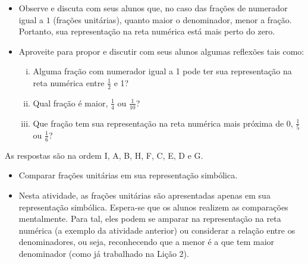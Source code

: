 \begin{orientacoes}{}{}
   \begin{itemize}
   \item  Observe e discuta com seus alunos que, no caso das frações de numerador igual a $1$ (frações unitárias), quanto maior o denominador, menor a fração. Portanto, sua representação na reta numérica está mais perto do zero.
   \item  Aproveite para propor e discutir com seus alunos algumas reflexões tais como:
   \begin{enumerate}[(i)]
    \item Alguma fração com numerador igual a 1 pode ter sua representação na reta numérica entre $\frac{1}{2}$ e 1?
    \item Qual fração é maior, $\frac{1}{4}$ ou $\frac{1}{10}$?
    \item Que fração tem sua representação na reta numérica mais próxima de 0, $\frac{1}{5}$ ou $\frac{1}{6}$?
   \end{enumerate}

  \end{itemize}
\end{orientacoes}

\begin{solucao}{}{}

As respostas são na ordem I, A, B, H, F, C, E, D e G.

\end{solucao}
\vfill


\begin{objetivos}[label=chap3-ativ14]{}{}
  \begin{itemize}
  \item Comparar frações unitárias em sua representação simbólica.
    \end{itemize}
\end{objetivos}

\begin{orientacoes}{}{}
\begin{itemize}
 \item  Nesta atividade, as frações unitárias são apresentadas apenas em sua  representação simbólica. Espera-se que os alunos realizem as comparações mentalmente. Para tal, eles podem se amparar na representação na reta numérica (a exemplo da atividade anterior) ou considerar a relação entre os denominadores, ou seja, reconhecendo que a menor é a que tem maior denominador (como já trabalhado na Lição 2).
\end{itemize}
\end{orientacoes}


